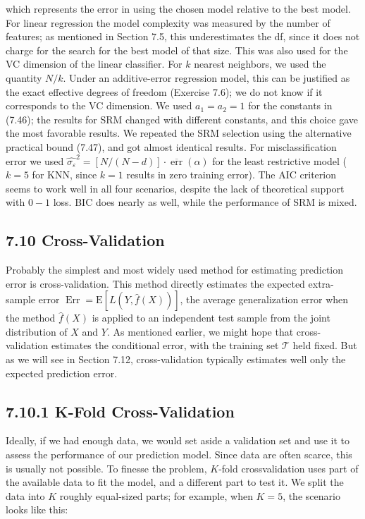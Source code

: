 \documentclass[10pt]{article}
\begin{document}
which represents the error in using the chosen model relative to the best model. For linear regression the model complexity was measured by the number of features; as mentioned in Section 7.5, this underestimates the df, since it does not charge for the search for the best model of that size. This was also used for the VC dimension of the linear classifier. For $k$ nearest neighbors, we used the quantity $N / k$. Under an additive-error regression model, this can be justified as the exact effective degrees of freedom (Exercise 7.6); we do not know if it corresponds to the VC dimension. We used $a_{1}=a_{2}=1$ for the constants in (7.46); the results for SRM changed with different constants, and this choice gave the most favorable results. We repeated the SRM selection using the alternative practical bound (7.47), and got almost identical results. For misclassification error we used ${\hat{\sigma_{\varepsilon}}}^{2}=[N /(N-d)] \cdot \overline{\operatorname{err}}(\alpha)$ for the least restrictive model ( $k=5$ for KNN, since $k=1$ results in zero training error). The AIC criterion seems to work well in all four scenarios, despite the lack of theoretical support with $0-1$ loss. BIC does nearly as well, while the performance of SRM is mixed.

\subsection*{7.10 Cross-Validation}
Probably the simplest and most widely used method for estimating prediction error is cross-validation. This method directly estimates the expected extra-sample error $\operatorname{Err}=\mathrm{E}[L(Y, \hat{f}(X))]$, the average generalization error when the method $\hat{f}(X)$ is applied to an independent test sample from the joint distribution of $X$ and $Y$. As mentioned earlier, we might hope that cross-validation estimates the conditional error, with the training set $\mathcal{T}$ held fixed. But as we will see in Section 7.12, cross-validation typically estimates well only the expected prediction error.

\subsection*{7.10.1 K-Fold Cross-Validation}
Ideally, if we had enough data, we would set aside a validation set and use it to assess the performance of our prediction model. Since data are often scarce, this is usually not possible. To finesse the problem, $K$-fold crossvalidation uses part of the available data to fit the model, and a different part to test it. We split the data into $K$ roughly equal-sized parts; for example, when $K=5$, the scenario looks like this:
\end{document}
